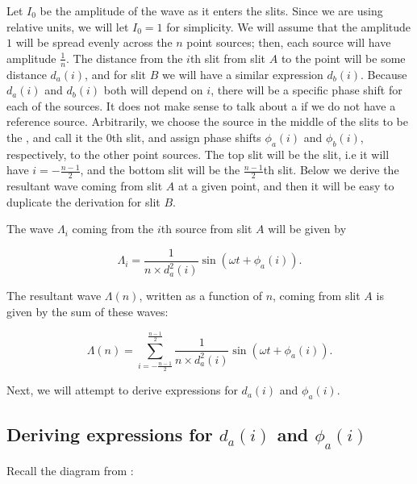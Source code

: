\documentclass{paper}
\begin{document}
Let $I_0$ be the amplitude of the wave as it enters the slits. Since we are using relative units, we will let $I_0 = 1$ for simplicity. We will assume that the amplitude $1$ will be spread evenly across the $n$ point sources; then, each source will have amplitude $\frac{1}{n}$. The distance from the $i$th slit from slit $A$ to the point will be some distance $d_a(i)$, and for slit $B$ we will have a similar expression $d_b(i)$. Because $d_a(i)$ and $d_b(i)$ both will depend on $i$, there will be a specific phase shift for each of the sources. It does not make sense to talk about a  if we do not have a reference source. Arbitrarily, we choose the source in the middle of the slits to be the , and call it the $0$th slit, and assign phase shifts $\phi_a(i)$ and $\phi_b(i)$, respectively, to the other point sources. The top slit will be the  slit, i.e it will have $i = -\frac{n - 1}{2}$, and the bottom slit will be the $\frac{n - 1}{2}$th slit. Below we derive the resultant wave coming from slit $A$ at a given point, and then it will be easy to duplicate the derivation for slit $B$.

The wave $\Lambda_i$ coming from the $i$th source from slit $A$ will be given by

\begin{equation*}
    \Lambda_i = \frac{1}{n \times d_a^2(i)}\sin(\omega t + \phi_a(i)).
\end{equation*}

The resultant wave $\Lambda(n)$, written as a function of $n$, coming from slit $A$ is given by the sum of these waves:

\begin{equation}
    \label{eq:sum-of-sine-waves}
    \Lambda(n) = \sum_{i = -\frac{n - 1}{2}}^{\frac{n - 1}{2}} \frac{1}{n \times d_a^2(i)} \sin(\omega t + \phi_a(i)).
\end{equation}


Next, we will attempt to derive expressions for $d_a(i)$ and $\phi_a(i)$.

\subsection{Deriving expressions for $d_a(i)$ and $\phi_a(i)$}

Recall the diagram from :
\end{document}
